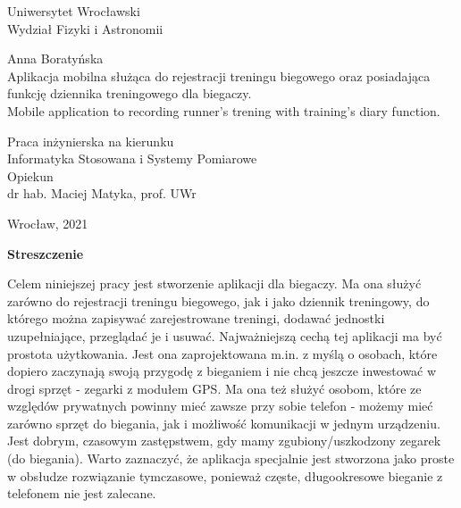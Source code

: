 \documentclass[a4paper,12pt,reqno]{article}
\begin{document}


\begin{center}

\thispagestyle{empty}

\Large 
Uniwersytet Wrocławski\\
Wydział Fizyki i Astronomii\\
\vspace{0.8cm}
\vspace{1.8cm}

\Large Anna Boratyńska \\
\vspace{3.2cm}
\Large Aplikacja mobilna służąca do rejestracji treningu biegowego oraz posiadająca funkcję dziennika treningowego dla biegaczy. \\
\vspace{1.5cm}
Mobile application to recording runner's trening with training's diary function.
\end{center}
\vspace{3.7cm}
\begin{flushright}
\large{ Praca inżynierska na kierunku \\Informatyka Stosowana i Systemy Pomiarowe \\}
\vspace{0.5cm}
\large{ Opiekun \\ dr hab. Maciej Matyka, prof. UWr}
\end{flushright}
\vspace{2.2cm}

\begin{center}
\large Wrocław, 2021
\end{center}
\newpage

\tableofcontents

\newpage

\begin{flushleft}
	\Large \textbf{Streszczenie}
\end{flushleft}
\vspace{1cm}

Celem niniejszej pracy jest stworzenie aplikacji dla biegaczy. Ma ona służyć zarówno do rejestracji treningu biegowego, jak i jako dziennik treningowy, do którego można zapisywać zarejestrowane treningi, dodawać jednostki uzupełniające, przeglądać je i usuwać. Najważniejszą cechą tej aplikacji ma być prostota użytkowania. Jest ona zaprojektowana m.in. z myślą o osobach, które dopiero zaczynają swoją przygodę z bieganiem i nie chcą jeszcze inwestować w drogi sprzęt - zegarki z modułem GPS. Ma ona też służyć osobom, które ze względów prywatnych powinny mieć zawsze przy sobie telefon - możemy mieć zarówno sprzęt do biegania, jak i możliwość komunikacji w jednym urządzeniu. Jest dobrym, czasowym zastępstwem, gdy mamy zgubiony/uszkodzony zegarek (do biegania). Warto zaznaczyć, że aplikacja specjalnie jest stworzona jako proste w obsłudze rozwiązanie tymczasowe, ponieważ częste, długookresowe bieganie z telefonem nie jest zalecane.\\
\end{document}
